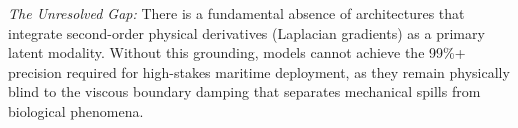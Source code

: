 \textit{The Unresolved Gap:} There is a fundamental absence of architectures that integrate second-order physical derivatives (Laplacian gradients) as a primary latent modality. Without this grounding, models cannot achieve the 99\%+ precision required for high-stakes maritime deployment, as they remain physically blind to the viscous boundary damping that separates mechanical spills from biological phenomena.
